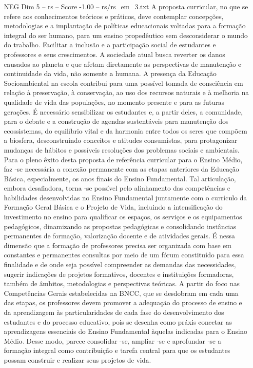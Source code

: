 \begin{textsample}{NEG Dim 5 – rs – Score -1.00 – rs/rs\_em\_3.txt}
A proposta curricular, no que se refere aos conhecimentos teóricos e práticos, deve contemplar concepções, metodologias e a implantação de políticas educacionais voltadas para a formação integral do ser humano, para um ensino propedêutico sem desconsiderar o mundo do trabalho.
Facilitar a inclusão e a participação social de estudantes e professores e seus crescimentos.
A sociedade atual busca reverter os danos causados ao planeta e que afetam diretamente as perspectivas de manutenção e continuidade da vida, não somente a humana.
A presença da Educação Socioambiental na escola contribui para uma possível tomada de consciência em relação à preservação, à conservação, ao uso dos recursos naturais e à melhoria na qualidade de vida das populações, no momento presente e para as futuras gerações.
É necessário sensibilizar os estudantes e, a partir deles, a comunidade, para o debate e a construção de agendas sustentáveis para manutenção dos ecossistemas, do equilíbrio vital e da harmonia entre todos os seres que compõem a biosfera, desconstruindo conceitos e atitudes consumistas, para protagonizar mudanças de hábitos e possíveis resoluções dos problemas sociais e ambientais.
Para o pleno êxito desta proposta de referência curricular para o Ensino Médio, faz -se necessária a conexão permanente com as etapas anteriores da Educação Básica, especialmente, os anos finais do Ensino Fundamental.
Tal articulação, embora desafiadora, torna -se possível pelo alinhamento das competências e habilidades desenvolvidas no Ensino Fundamental juntamente com o currículo da Formação Geral Básica e o Projeto de Vida, incluindo a intensificação do investimento no ensino para qualificar os espaços, os serviços e os equipamentos pedagógicos, dinamizando as propostas pedagógicas e consolidando instâncias permanentes de formação, valorização docente e de atividades gerais.
É nessa dimensão que a formação de professores precisa ser organizada com base em constantes e permanentes consultas por meio de um fórum constituído para essa finalidade e de onde seja possível compreender as demandas das necessidades, sugerir indicações de projetos formativos, docentes e instituições formadoras, também de âmbitos, metodologias e perspectivas teóricas.
A partir do foco nas Competências Gerais estabelecidas na BNCC, que se desdobram em cada uma das etapas, os professores devem promover a adequação do processo de ensino e da aprendizagem às particularidades de cada fase do desenvolvimento dos estudantes e do processo educativo, pois se desenha como práxis conectar as aprendizagens essenciais do Ensino Fundamental àquelas indicadas para o Ensino Médio.
Desse modo, parece consolidar -se, ampliar -se e aprofundar -se a formação integral como contribuição e tarefa central para que os estudantes possam construir e realizar seus projetos de vida.

\end{textsample}
